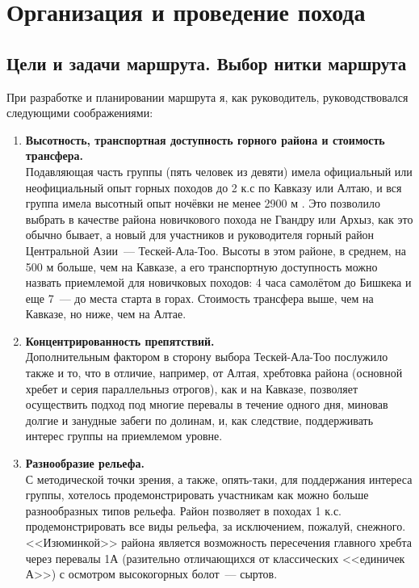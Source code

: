 \section{Организация и проведение похода}
\subsection{Цели и задачи маршрута. Выбор нитки маршрута}
При разработке и планировании маршрута я, как руководитель, руководствовался следующими соображениями:
\begin{enumerate} 
	\item \textbf{Высотность, транспортная доступность горного района и стоимость трансфера.}\\
	Подавляющая часть группы (пять человек из девяти) имела официальный или неофициальный опыт горных походов до 2 к.с по Кавказу \cite{Snegovskaya2024} или Алтаю, и вся группа имела высотный опыт ночёвки не менее 2900 м \cite{ostapiv2025}. Это позволило выбрать в качестве района новичкового похода не Гвандру или Архыз, как это обычно бывает, а новый для участников и руководителя горный район Центральной Азии~--- Тескей-Ала-Тоо. Высоты в этом районе, в среднем, на 500 м больше, чем на Кавказе, а его транспортную доступность можно назвать приемлемой для новичковых походов: 4 часа самолётом до Бишкека и еще 7~--- до места старта в горах. Стоимость трансфера выше, чем на Кавказе, но ниже, чем на Алтае. 
		
	\item \textbf{Концентрированность препятствий.}\\
	Дополнительным фактором в сторону выбора Тескей-Ала-Тоо послужило также и то, что в отличие, например, от Алтая, хребтовка района (основной хребет и серия параллельныз отрогов), как и на Кавказе, позволяет осуществить подход под многие перевалы в течение одного дня, миновав долгие и занудные забеги по долинам, и, как следствие, поддерживать интерес группы на приемлемом уровне.
	
	\item \textbf{Разнообразие рельефа.} \\
	С методической точки зрения, а также, опять-таки, для поддержания интереса группы, хотелось продемонстрировать участникам как можно больше разнообразных типов рельефа. Район позволяет в походах 1 к.с. продемонстрировать все виды рельефа, за исключением, пожалуй, снежного. <<Изюминкой>> района является возможность пересечения главного хребта через перевалы 1А (разительно отличающихся от классических <<единичек А>>) с осмотром высокогорных болот~--- сыртов.
	

\end{enumerate}
